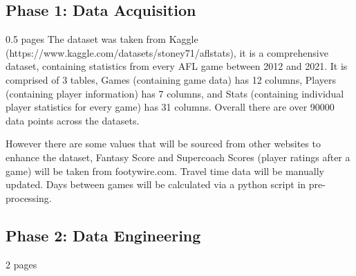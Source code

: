 \documentclass{imc-inf}
\begin{document}
	\subsection{Phase 1: Data Acquisition}
	0.5 pages
	The dataset was taken from Kaggle (https://www.kaggle.com/datasets/stoney71/aflstats), it is a comprehensive dataset, containing statistics from every AFL game between 2012 and 2021. It is comprised of 3 tables, Games (containing game data) has 12 columns, Players (containing player information) has 7 columns, and Stats (containing individual player statistics for every game) has 31 columns. Overall there are over 90000 data points across the datasets.
	
	However there are some values that will be sourced from other websites to enhance the dataset, Fantasy Score and Supercoach Scores (player ratings after a game) will be taken from footywire.com. Travel time data will be manually updated. Days between games will be calculated via a python script in pre-processing.
	
	\subsection{Phase 2: Data Engineering}
	2 pages
	
\end{document}
